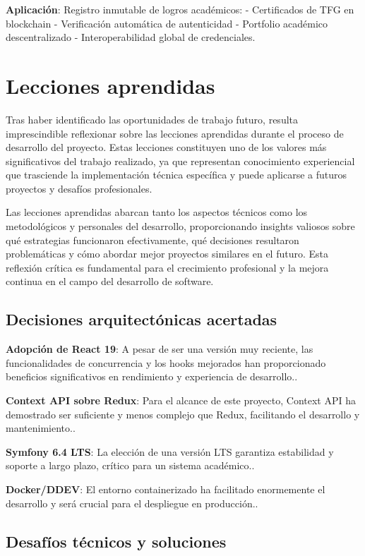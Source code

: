 \documentclass[12pt,a4paper,oneside]{report}
\begin{document}
\textbf{Aplicación}: Registro inmutable de logros académicos: -
Certificados de TFG en blockchain - Verificación automática de
autenticidad - Portfolio académico descentralizado - Interoperabilidad
global de credenciales.

\section{Lecciones aprendidas}\label{lecciones-aprendidas}

Tras haber identificado las oportunidades de trabajo futuro, resulta
imprescindible reflexionar sobre las lecciones aprendidas durante el
proceso de desarrollo del proyecto. Estas lecciones constituyen uno de
los valores más significativos del trabajo realizado, ya que representan
conocimiento experiencial que trasciende la implementación técnica
específica y puede aplicarse a futuros proyectos y desafíos
profesionales.

Las lecciones aprendidas abarcan tanto los aspectos técnicos como los
metodológicos y personales del desarrollo, proporcionando insights
valiosos sobre qué estrategias funcionaron efectivamente, qué decisiones
resultaron problemáticas y cómo abordar mejor proyectos similares en el
futuro. Esta reflexión crítica es fundamental para el crecimiento
profesional y la mejora continua en el campo del desarrollo de software.

\subsection{Decisiones arquitectónicas
acertadas}\label{decisiones-arquitectuxf3nicas-acertadas}

\textbf{Adopción de React 19}: A pesar de ser una versión muy reciente,
las funcionalidades de concurrencia y los hooks mejorados han
proporcionado beneficios significativos en rendimiento y experiencia de
desarrollo..

\textbf{Context API sobre Redux}: Para el alcance de este proyecto,
Context API ha demostrado ser suficiente y menos complejo que Redux,
facilitando el desarrollo y mantenimiento..

\textbf{Symfony 6.4 LTS}: La elección de una versión LTS garantiza
estabilidad y soporte a largo plazo, crítico para un sistema académico..

\textbf{Docker/DDEV}: El entorno containerizado ha facilitado
enormemente el desarrollo y será crucial para el despliegue en
producción..

\subsection{Desafíos técnicos y
soluciones}\label{desafuxedos-tuxe9cnicos-y-soluciones}
\end{document}
